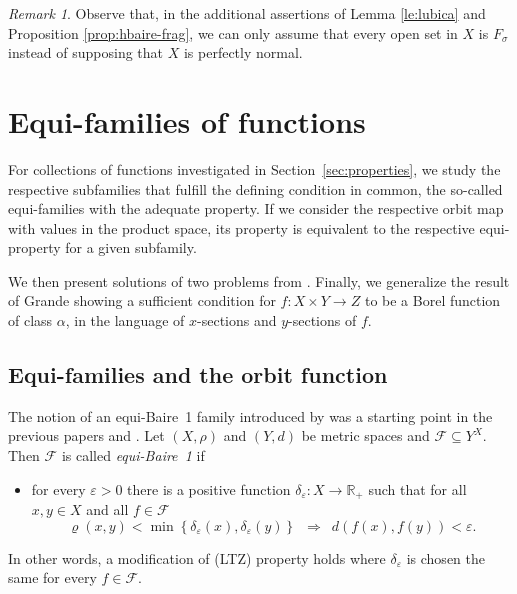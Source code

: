 \documentclass[a4paper]{amsart}
\theoremstyle{plain}
\theoremstyle{definition}
\theoremstyle{remark}
\newtheorem{remark}[theorem]{Remark}
\numberwithin{equation}{section}
\begin{document}
 \begin{remark}
 Observe that, in the additional assertions of Lemma \ref{le:lubica} and Proposition \ref{prop:hbaire-frag}, we can only assume that every open set in $X$ is $F_\sigma$ instead of supposing that $X$ is perfectly normal.
 \end{remark}


 \section{Equi-families of functions}
 \label{sec:families}
 
 For collections of functions investigated in Section~\ref{sec:properties}, we study the respective subfamilies that fulfill the defining condition in common, the so-called equi-families with the adequate property. If we consider the respective orbit map with values in the product space, its property is equivalent to the respective equi-property for a given subfamily.
 
 We then present solutions of two problems from \cite{BKS}. Finally, we generalize the result of Grande \cite{Gr} showing a sufficient condition for $f\colon X\times Y\to Z$ to be a Borel function of class $\alpha$, in the language of $x$-sections and $y$-sections of $f$.
 
	\subsection{Equi-families and the orbit function}
	The notion of an equi-Baire~1 family introduced by \cite{Le} was a starting point in the previous papers \cite{BKS} and \cite{BHH}. Let $(X,\rho)$ and $(Y,d)$ be metric spaces and $\mathcal F\subseteq Y^X$. Then $\mathcal F$ is called \emph{equi-Baire~1} if 
    \begin{itemize}
        \item 
  for every $\varepsilon>0$ there is a positive function $\delta_\varepsilon\colon X\to\mathbb R_+$ such that for all $x,y\in X$ and all $f\in\mathcal F$
		\begin{equation*} 
			\varrho(x,y)<\min\left\{\delta_\varepsilon(x),\delta_\varepsilon(y)\right\} \,\,\,\Longrightarrow\,\,\,  d(f(x),f(y))<\varepsilon.
		\end{equation*}
	\end{itemize}
    In other words, a modification of (LTZ) property holds where $\delta_\varepsilon$ is chosen the same for every $f\in\mathcal F$.
\end{document}
